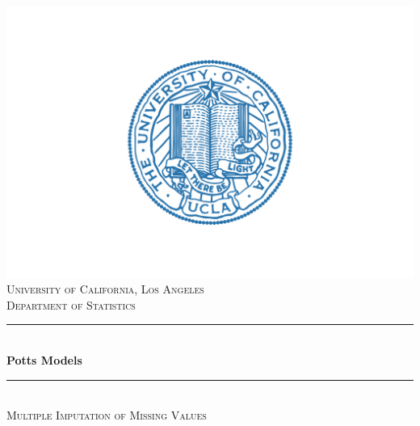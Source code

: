 \documentclass[12pt, twoside]{article}
\newcommand{\1}{\mathbb{1}}
\begin{document}
\begin{titlepage}

    \newcommand{\HRule}{\rule{\linewidth}{0.5mm}} %

    \center %
 
    \includegraphics[scale = 0.22]{campus-seal.jpg}\\[0.5cm]
    
     \textsc{\large University of California, Los Angeles}\\[0.2cm] %
     \textsc{\large Department of Statistics}\\[0.5cm]

    \HRule \\[0.4cm]
    { \huge \bfseries Potts Models}\\[0.2cm] %
    \HRule \\[0.4cm]
    \textsc{\large Multiple Imputation of Missing Values %
    }\\[2.0 cm]
 
    

\end{titlepage}
\end{document}
